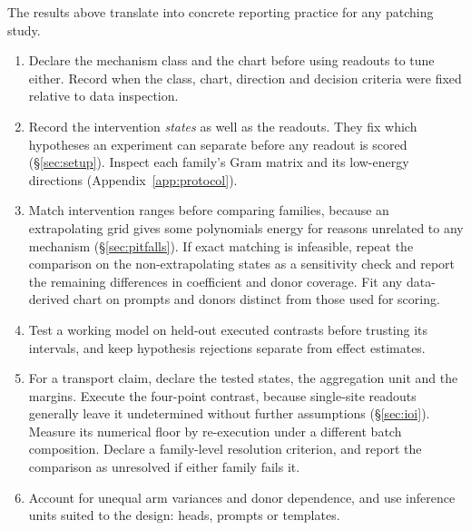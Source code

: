 \documentclass{article}
\theoremstyle{plain}
\theoremstyle{definition}
\begin{document}
The results above translate into concrete reporting practice for any patching study.

\begin{tcolorbox}[breakable,title={An audit checklist for patching evidence}]
\begin{enumerate}[leftmargin=1.4em,itemsep=1pt,topsep=1pt,parsep=0pt]
\item Declare the mechanism class and the chart before using readouts to tune either. Record when the class, chart,
direction and decision criteria were fixed relative to data inspection.
\item Record the intervention \emph{states} as well as the readouts. They fix which hypotheses an experiment can
separate before any readout is scored (\S\ref{sec:setup}). Inspect each family's Gram matrix and its low-energy
directions (Appendix~\ref{app:protocol}).
\item Match intervention ranges before comparing families, because an extrapolating grid gives some polynomials energy
for reasons unrelated to any mechanism (\S\ref{sec:pitfalls}). If exact matching is infeasible,
repeat the comparison on the non-extrapolating states as a sensitivity check and report the remaining differences in
coefficient and donor coverage. Fit any data-derived chart on prompts and donors distinct from those used for scoring.
\item Test a working model on held-out executed contrasts before trusting its intervals, and keep hypothesis rejections
separate from effect estimates.
\item For a transport claim, declare the tested states, the aggregation unit and the margins. Execute the four-point
contrast, because single-site readouts generally leave it undetermined without further assumptions (\S\ref{sec:ioi}).
Measure its numerical floor by re-execution under a different batch composition. Declare a family-level resolution
criterion, and report the comparison as unresolved if either family fails it.
\item Account for unequal arm variances and donor dependence, and use inference units suited to the design: heads,
prompts or templates.
\end{enumerate}
\end{tcolorbox}
\end{document}
